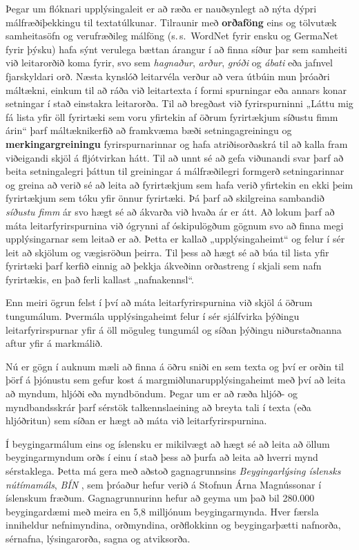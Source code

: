 \begin{multicols}{2}
Þegar um flóknari upplýsingaleit er að ræða er nauðsynlegt að nýta dýpri málfræðiþekkingu til textatúlkunar. Tilraunir með \textbf{orðaföng} eins og tölvutæk samheitasöfn og verufræðileg málföng (s.\,s.~WordNet fyrir ensku og GermaNet fyrir þýsku) hafa sýnt verulega bættan árangur í að finna síður þar sem samheiti við leitarorðið koma fyrir, svo sem  \textit{hagnaður}, \textit{arður}, \textit{gróði} og  \textit{ábati} eða jafnvel fjarskyldari orð.
Næsta kynslóð leitarvéla verður að vera útbúin mun þróaðri máltækni, einkum til að ráða við leitartexta í formi spurningar eða annars konar setningar í stað einstakra leitarorða. Til að bregðast við fyrirspurninni „Láttu mig fá lista yfir öll fyrirtæki sem voru yfirtekin af öðrum fyrirtækjum síðustu fimm árin“ þarf máltæknikerfið að framkvæma bæði setningagreiningu og \textbf{merkingargreiningu} fyrirspurnarinnar og hafa atriðisorðaskrá til að kalla fram viðeigandi skjöl á fljótvirkan hátt. Til að unnt sé að gefa viðunandi svar þarf að beita setningalegri þáttun til greiningar á málfræðilegri formgerð setningarinnar og greina að verið sé að leita að fyrirtækjum sem hafa verið yfirtekin en ekki þeim fyrirtækjum sem tóku yfir önnur fyrirtæki. Þá þarf að skilgreina sambandið  \textit{síðustu fimm} ár svo hægt sé að ákvarða við hvaða ár er átt. Að lokum þarf að máta leitarfyrirspurnina við ógrynni af óskipulögðum gögnum svo að finna megi upplýsingarnar sem leitað er að. Þetta er kallað „upplýsingaheimt“ og felur í sér leit að skjölum og vægisröðun þeirra. Til þess að hægt sé að búa til lista yfir fyrirtæki þarf kerfið einnig að þekkja ákveðinn orða\-streng í skjali sem nafn fyrirtækis, en það ferli kallast „nafnakennsl“. 

Enn meiri ögrun felst í því að máta leitarfyrirspurnina við skjöl á öðrum tungumálum. Þvermála upplýsingaheimt felur í sér sjálfvirka þýðingu leitarfyrirspurnar yfir á öll möguleg tungumál og síðan þýðingu niðurstaðnanna aftur yfir á markmálið.

Nú er gögn í auknum mæli að finna á öðru sniði en sem texta og því er orðin til þörf á þjónustu sem gefur kost á margmiðlunarupplýsingaheimt með því að leita að myndum, hljóði eða myndböndum. Þegar um er að ræða hljóð- og myndbandsskrár þarf sérstök talkennslaeining að breyta tali í texta (eða hljóðritun) sem síðan er hægt að máta við leitarfyrirspurnina.

Í beygingarmálum eins og íslensku er mikilvægt að hægt sé að leita að öllum beygingarmyndum orðs í einu í stað þess að þurfa að leita að hverri mynd sérstaklega. Þetta má gera með aðstoð gagnagrunnsins \textit{Beygingarlýsing íslensks nútímamáls}, \textit{BÍN} \cite{bin1}, sem þróaður hefur verið á Stofnun Árna Magnússonar í íslenskum fræðum. Gagnagrunnurinn hefur að geyma um það bil 280.000 beygingardæmi með meira en 5,8 milljónum beygingarmynda. Hver færsla inniheldur nefnimyndina, orðmyndina, orðflokkinn og beygingarþætti nafnorða, sérnafna, lýsingarorða, sagna og atviksorða.


\end{multicols}
